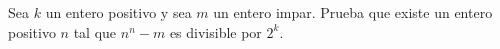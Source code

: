 Sea $k$ un entero positivo y sea $m$ un entero impar. Prueba que existe un entero positivo $n$ tal que $n^n-m$ es divisible por $2^k$.